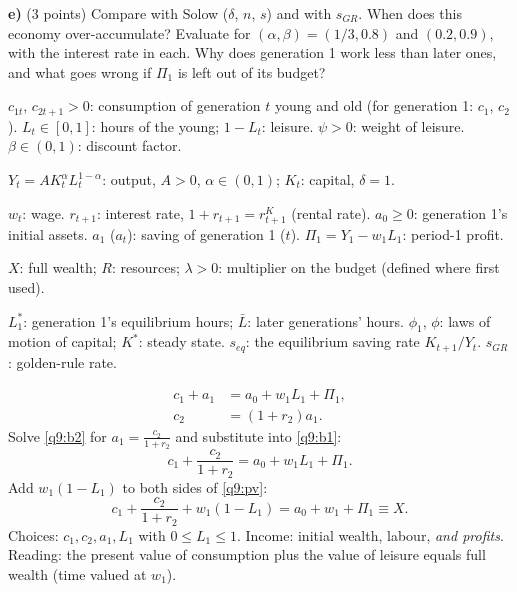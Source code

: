 \textbf{e)} (3 points) Compare with Solow ($\delta$, $n$, $s$) and with $s_{GR}$. When does this economy over-accumulate? Evaluate for
$(\alpha,\beta)=(1/3,0.8)$ and $(0.2,0.9)$, with the interest rate in each. Why does generation 1 work less than later ones, and what goes
wrong if $\Pi_1$ is left out of its budget?
\resolespaco
\begin{sol}
\begin{notacao}
\item $c_{1t}$, $c_{2t+1}>0$: consumption of generation $t$ young and old (for generation 1: $c_1$, $c_2$). $L_t\in[0,1]$: hours of the
young; $1-L_t$: leisure. $\psi>0$: weight of leisure. $\beta\in(0,1)$: discount factor.
\item $Y_t=AK_t^\alpha L_t^{1-\alpha}$: output, $A>0$, $\alpha\in(0,1)$; $K_t$: capital, $\delta=1$.
\item $w_t$: wage. $r_{t+1}$: interest rate, $1+r_{t+1}=r^K_{t+1}$ (rental rate). $a_0\ge0$: generation 1's initial assets.
$a_1$ ($a_t$): saving of generation 1 ($t$). $\Pi_1=Y_1-w_1L_1$: period-1 profit.
\item $X$: full wealth; $R$: resources; $\lambda>0$: multiplier on the budget (defined where first used).
\item $L_1^\ast$: generation 1's equilibrium hours; $\bar L$: later generations' hours. $\phi_1$, $\phi$: laws of motion of capital;
$K^\ast$: steady state. $s_{eq}$: the equilibrium saving rate $K_{t+1}/Y_t$. $s_{GR}$: golden-rule rate.
\end{notacao}
\begin{align}
c_1+a_1 &= a_0+w_1L_1+\Pi_1, \label{q9:b1}\\
c_2 &= (1+r_2)a_1. \label{q9:b2}
\end{align}
Solve \eqref{q9:b2} for $a_1=\frac{c_2}{1+r_2}$ and substitute into \eqref{q9:b1}:
\begin{equation}
c_1+\frac{c_2}{1+r_2}=a_0+w_1L_1+\Pi_1. \label{q9:pv}
\end{equation}
Add $w_1(1-L_1)$ to both sides of \eqref{q9:pv}:
\begin{equation}
c_1+\frac{c_2}{1+r_2}+w_1(1-L_1)=a_0+w_1+\Pi_1\equiv X. \label{q9:full}
\end{equation}
Choices: $c_1,c_2,a_1,L_1$ with $0\le L_1\le1$. Income: initial wealth, labour, \emph{and profits}. Reading: the present value of
consumption plus the value of leisure equals full wealth (time valued at $w_1$).

\end{sol}
